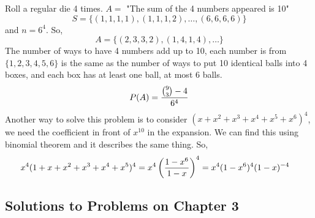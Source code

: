 \documentclass[english, 11pt]{article}
\begin{document}
  \begin{exmp}
    Roll a regular die 4 times. $A = $ "The sum of the 4 numbers appeared is 10"
    \[S= \{ (1,1,1,1),(1,1,1,2),\ldots,(6,6,6,6)\} \]
    and $n = 6^4$. So,
    \[ A = \{ (2,3,3,2), (1,4,1,4), \ldots \} \]
    The number of ways to have 4 numbers add up to 10, each number is from $\{ 1,2,3,4,5,6 \}$ is the same as the number of ways to put 10 identical balls into 4 boxes, and each box has at least one ball, at most 6 balls.
    \[ P(A) = \frac{{9 \choose 3}-4}{6^4} \]
    Another way to solve this problem is to consider $(x+x^2+x^3+x^4+x^5+x^6)^4$, we need the coefficient in front of $x^10$ in the expansion. We can find this using binomial theorem and it describes the same thing. So,
    \begin{align*}
      x^4(1+x+x^2+x^3+x^4+x^5)^4 & = x^4\left(\frac{1-x^6}{1-x}\right)^4 = x^4(1-x^6)^4(1-x)^{-4}
    \end{align*}
  \end{exmp}

  \subsection{Solutions to Problems on Chapter 3}
\end{document}
